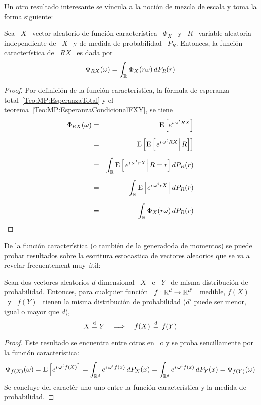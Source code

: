 {Un otro resultado  interesante se v\'incula a la noci\'on de  mezcla de escala y
toma la forma siguiente:
%
\begin{teorema}
  Sea \  $X$ \ vector aleatorio de  funci\'on caracter\'istica \ $\Phi_X$  \ y \
  $R$ \ variable aleatoria independiente de  \ $X$ \ y de medida de probabilidad
  \ $P_R$. Entonces, la funci\'on caracter\'istica de \ $R X$ \ es dada por
  \[
  \Phi_{R X}(\omega) = \int_{\mathbb{R}} \Phi_X(r \omega) \, dP_R(r)
  \]
\end{teorema}
%
\begin{proof}
  Por definici\'on  de la funci\'on caracter\'istica, la  f\'ormula de esperanza
  total~\ref{Teo:MP:EsperanzaTotal}                     y                     el
  teorema~\ref{Teo:MP:EsperanzaCondicionalFXY}, se tiene
  \begin{eqnarray*}
  \Phi_{R X}(\omega) & = & \operatorname{E}\left[ e^{\imath \, \omega^t R X} \right]\\[2mm]
  & = & \operatorname{E}\left[ \operatorname{E}\left[ \left. e^{\imath \, \omega^t R X} \right| R \right] \right]\\[2mm]
  & = & \int_{\mathbb{R}} \operatorname{E}\left[ \left. e^{\imath \, \omega^t r X} \right| R=r \right] dP_R(r)\\[2mm]
  & = & \int_{\mathbb{R}} \operatorname{E}\left[ e^{\imath \, \omega^t r X} \right] dP_R(r)\\[2mm]
  & = & \int_{\mathbb{R}} \Phi_X(r \omega) \, dP_R(r)
  \end{eqnarray*}
\end{proof}
 
De la funci\'on  caracter\'istica (o tambi\'en de la  generadoda de momentos) se
puede probar resultados sobre la escritura estocastica de vectores aleaorios que
se va a revelar frecuentement muy \'util:
%
\begin{teorema}\label{Teo:MP:IgualdadDistribucionFuncionVA}
  Sean  dos vectores  aleatorios $d$-dimensional  \ $X$  \ e  \ $Y$  \  de misma
  distribuci\'on  de  probabilidad. Entonces,  para  cualquier  funci\'on \  $f:
  \mathbb{R}^d  \to \mathbb{R}^{d'}$ \  medible, $f(X)$  \ y  \ $f(Y)$  \ tienen  la misma
  distribuci\'on de probabilidad ($d'$ puede  ser menor, igual o mayor que $d$),
  \ie
  \[
  X  \stackrel{\mathrm{d}}{=}  Y \quad  \Longrightarrow  \quad  f(X) \, \stackrel{\mathrm{d}}{=} \, f(Y)
  \]
\end{teorema}
%
\begin{proof}
  Este resultado se encuentra entre otros en~\cite[aserci\'on~2~p.~13]{FanKot90}
  o \cite{Zol86} y se proba sencillamente por la funci\'on caracter\'istica:
  \[
  \Phi_{f(X)}(\omega)  =  \operatorname{E}\left[  e^{\imath  \,  \omega^t  f(X)}  \right]  =
  \int_{\mathbb{R}^d}  e^{\imath  \,  \omega^t  f(x)}  \,  dP_X(x)  =  \int_{\mathbb{R}^d}
  e^{\imath \, \omega^t f(x)} \, dP_Y(x) = \Phi_{f(Y)}(\omega)
  \]
  Se concluye  del caract\'er uno-uno  entre la funci\'on caracter\'istica  y la
  medida de probabilidad.
\end{proof} 
}

